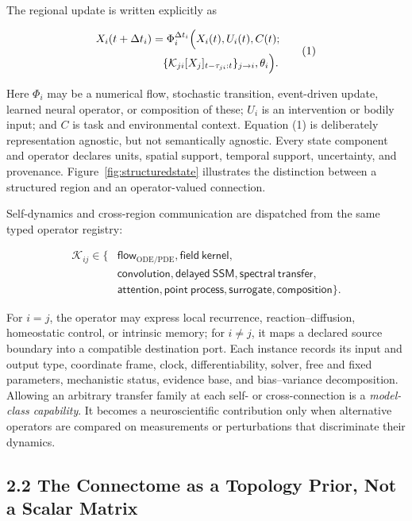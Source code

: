 The regional update is written explicitly as

\[
\begin{aligned}
X_i(t+\Delta t_i)
&=\Phi_i^{\Delta t_i}\Bigl(
X_i(t),U_i(t),C(t);\\
&\quad
\{\mathcal{K}_{ji}[X_j]_{t-\tau_{ji}:t}\}_{j\rightarrow i},
\theta_i\Bigr).
\end{aligned}
\tag{1}
\]

Here \(\Phi_i\) may be a numerical flow, stochastic transition, event-driven
update, learned neural operator, or composition of these; \(U_i\) is an
intervention or bodily input; and \(C\) is task and environmental context.
Equation (1) is deliberately representation agnostic, but not semantically
agnostic. Every state component and operator declares units, spatial support,
temporal support, uncertainty, and provenance. Figure~\ref{fig:structuredstate}
illustrates the distinction between a structured region and an
operator-valued connection.

Self-dynamics and cross-region communication are dispatched from the same
typed operator registry:

\[
\begin{aligned}
\mathcal{K}_{ij}\in\bigl\{&
\mathsf{flow}_{\mathrm{ODE/PDE}},
\mathsf{field\ kernel},\\
&\mathsf{convolution},
\mathsf{delayed\ SSM},
\mathsf{spectral\ transfer},\\
&
\mathsf{attention},
\mathsf{point\ process},
\mathsf{surrogate},
\mathsf{composition}\bigr\}.
\end{aligned}
\tag{2}
\]

For \(i=j\), the operator may express local recurrence, reaction--diffusion,
homeostatic control, or intrinsic memory; for \(i\ne j\), it maps a declared
source boundary into a compatible destination port. Each instance records its
input and output type, coordinate frame, clock, differentiability, solver,
free and fixed parameters, mechanistic status, evidence base, and
bias--variance decomposition. Allowing an arbitrary transfer family at each
self- or cross-connection is a \emph{model-class capability}. It becomes a
neuroscientific contribution only when alternative operators are compared on
measurements or perturbations that discriminate their dynamics.

\StructuredStateFigure

\subsection{2.2 The Connectome as a Topology Prior, Not a Scalar Matrix}

